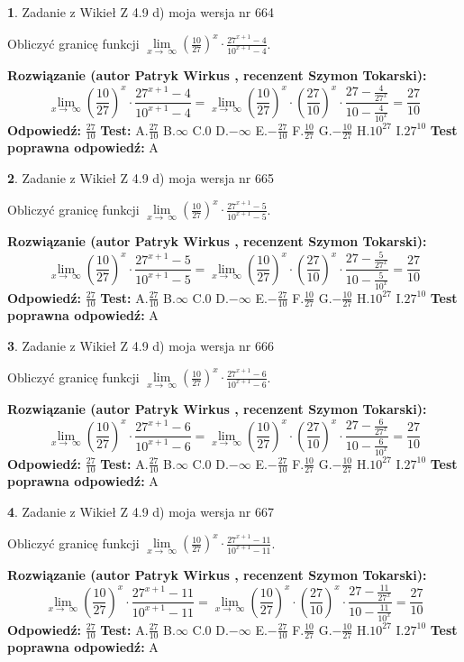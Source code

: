\documentclass[12pt, a4paper]{article}
\theoremstyle{definition} %
\newtheorem{zad}{}
\newcommand{\zadStart}[1]{\begin{zad}#1\newline}
\newcommand{\zadStop}{\end{zad}}
\newcommand{\rozwStart}[2]{\noindent \textbf{Rozwiązanie (autor #1 , recenzent #2): }\newline}
\newcommand{\rozwStop}{\newline}
\newcommand{\odpStart}{\noindent \textbf{Odpowiedź:}\newline}
\newcommand{\odpStop}{\newline}
\newcommand{\testStart}{\noindent \textbf{Test:}\newline}
\newcommand{\testStop}{\newline}
\newcommand{\kluczStart}{\noindent \textbf{Test poprawna odpowiedź:}\newline}
\newcommand{\kluczStop}{\newline}
\begin{document}
\zadStart{Zadanie z Wikieł Z 4.9 d) moja wersja nr 664}


Obliczyć granicę funkcji  $\lim\limits_{x\to\ \infty}(\frac{10}{27})^{x}\cdot\frac{27^{x+1}-4}{10^{x+1}-4}$.
\zadStop
\rozwStart{Patryk Wirkus}{Szymon Tokarski}
$$\lim\limits_{x\to\ \infty}(\frac{10}{27})^{x}\cdot\frac{27^{x+1}-4}{10^{x+1}-4}=\lim\limits_{x\to\ \infty}(\frac{10}{27})^{x}\cdot(\frac{27}{10})^{x} \cdot \frac{27-\frac{4}{27^{x}}}{10-\frac{4}{10^{x}}} = \frac{27}{10}$$
\rozwStop
\odpStart
$\frac{27}{10}$
\odpStop
\testStart
A.$\frac{27}{10}$ B.$\infty$ C.$0$ D.$-\infty$ E.$-\frac{27}{10}$
F.$\frac{10}{27}$ G.$-\frac{10}{27}$
H.$10^{27}$
I.$27^{10}$
\testStop
\kluczStart
A
\kluczStop



\zadStart{Zadanie z Wikieł Z 4.9 d) moja wersja nr 665}


Obliczyć granicę funkcji  $\lim\limits_{x\to\ \infty}(\frac{10}{27})^{x}\cdot\frac{27^{x+1}-5}{10^{x+1}-5}$.
\zadStop
\rozwStart{Patryk Wirkus}{Szymon Tokarski}
$$\lim\limits_{x\to\ \infty}(\frac{10}{27})^{x}\cdot\frac{27^{x+1}-5}{10^{x+1}-5}=\lim\limits_{x\to\ \infty}(\frac{10}{27})^{x}\cdot(\frac{27}{10})^{x} \cdot \frac{27-\frac{5}{27^{x}}}{10-\frac{5}{10^{x}}} = \frac{27}{10}$$
\rozwStop
\odpStart
$\frac{27}{10}$
\odpStop
\testStart
A.$\frac{27}{10}$ B.$\infty$ C.$0$ D.$-\infty$ E.$-\frac{27}{10}$
F.$\frac{10}{27}$ G.$-\frac{10}{27}$
H.$10^{27}$
I.$27^{10}$
\testStop
\kluczStart
A
\kluczStop



\zadStart{Zadanie z Wikieł Z 4.9 d) moja wersja nr 666}


Obliczyć granicę funkcji  $\lim\limits_{x\to\ \infty}(\frac{10}{27})^{x}\cdot\frac{27^{x+1}-6}{10^{x+1}-6}$.
\zadStop
\rozwStart{Patryk Wirkus}{Szymon Tokarski}
$$\lim\limits_{x\to\ \infty}(\frac{10}{27})^{x}\cdot\frac{27^{x+1}-6}{10^{x+1}-6}=\lim\limits_{x\to\ \infty}(\frac{10}{27})^{x}\cdot(\frac{27}{10})^{x} \cdot \frac{27-\frac{6}{27^{x}}}{10-\frac{6}{10^{x}}} = \frac{27}{10}$$
\rozwStop
\odpStart
$\frac{27}{10}$
\odpStop
\testStart
A.$\frac{27}{10}$ B.$\infty$ C.$0$ D.$-\infty$ E.$-\frac{27}{10}$
F.$\frac{10}{27}$ G.$-\frac{10}{27}$
H.$10^{27}$
I.$27^{10}$
\testStop
\kluczStart
A
\kluczStop



\zadStart{Zadanie z Wikieł Z 4.9 d) moja wersja nr 667}


Obliczyć granicę funkcji  $\lim\limits_{x\to\ \infty}(\frac{10}{27})^{x}\cdot\frac{27^{x+1}-11}{10^{x+1}-11}$.
\zadStop
\rozwStart{Patryk Wirkus}{Szymon Tokarski}
$$\lim\limits_{x\to\ \infty}(\frac{10}{27})^{x}\cdot\frac{27^{x+1}-11}{10^{x+1}-11}=\lim\limits_{x\to\ \infty}(\frac{10}{27})^{x}\cdot(\frac{27}{10})^{x} \cdot \frac{27-\frac{11}{27^{x}}}{10-\frac{11}{10^{x}}} = \frac{27}{10}$$
\rozwStop
\odpStart
$\frac{27}{10}$
\odpStop
\testStart
A.$\frac{27}{10}$ B.$\infty$ C.$0$ D.$-\infty$ E.$-\frac{27}{10}$
F.$\frac{10}{27}$ G.$-\frac{10}{27}$
H.$10^{27}$
I.$27^{10}$
\testStop
\kluczStart
A
\kluczStop
\end{document}
